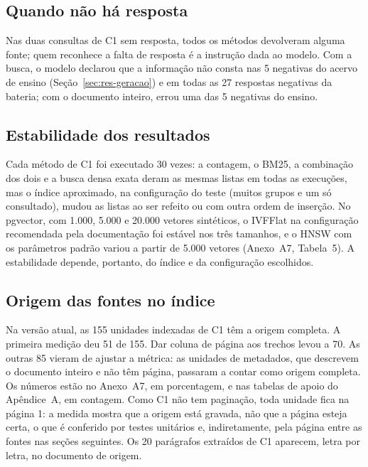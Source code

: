 \documentclass[12pt]{article}
\begin{document}
\subsection{Quando não há resposta}
\label{sec:res-ausencia}

Nas duas consultas de C1 sem resposta, todos os métodos devolveram alguma fonte; quem reconhece a falta de resposta é a instrução dada ao modelo. Com a busca, o modelo declarou que a informação não consta nas 5 negativas do acervo de ensino (Seção~\ref{sec:res-geracao}) e em todas as 27 respostas negativas da bateria; com o documento inteiro, errou uma das 5 negativas do ensino.

\subsection{Estabilidade dos resultados}
\label{sec:res-determinismo}

Cada método de C1 foi executado 30 vezes: a contagem, o BM25, a combinação dos dois e a busca densa exata deram as mesmas listas em todas as execuções, mas o índice aproximado, na configuração do teste (muitos grupos e um só consultado), mudou as listas ao ser refeito ou com outra ordem de inserção. No pgvector, com 1.000, 5.000 e 20.000 vetores sintéticos, o IVFFlat na configuração recomendada pela documentação foi estável nos três tamanhos, e o HNSW com os parâmetros padrão variou a partir de 5.000 vetores (Anexo~A7, Tabela~5). A estabilidade depende, portanto, do índice e da configuração escolhidos.

\subsection{Origem das fontes no índice}
\label{sec:res-auditabilidade}

Na versão atual, as 155 unidades indexadas de C1 têm a origem completa. A primeira medição deu 51 de 155. Dar coluna de página aos trechos levou a 70. As outras 85 vieram de ajustar a métrica: as unidades de metadados, que descrevem o documento inteiro e não têm página, passaram a contar como origem completa. Os números estão no Anexo~A7, em porcentagem, e nas tabelas de apoio do Apêndice~A, em contagem. Como C1 não tem paginação, toda unidade fica na página 1: a medida mostra que a origem está gravada, não que a página esteja certa, o que é conferido por testes unitários e, indiretamente, pela página entre as fontes nas seções seguintes. Os 20 parágrafos extraídos de C1 aparecem, letra por letra, no documento de origem.
\end{document}
